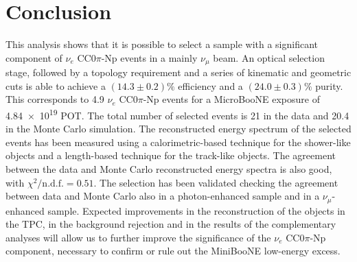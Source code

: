 
\section{Conclusion}
This analysis shows that it is possible to select a sample with a significant component of $\nu_{e}$ CC0$\pi$-Np events in a mainly $\nu_\mu$ beam. An optical selection stage, followed by a topology requirement and a series of kinematic and geometric cuts is able to achieve a $(14.3\pm0.2)\%$ efficiency and a $(24.0\pm0.3)\%$ purity. This corresponds to 4.9 $\nu_{e}$ CC0$\pi$-Np events for a MicroBooNE exposure of \num{4.84e19} POT. The total number of selected events is 21 in the data and 20.4 in the Monte Carlo simulation. 
The reconstructed energy spectrum of the selected events has been measured using a calorimetric-based technique for the shower-like objects and a length-based technique for the track-like objects. The agreement between the data and Monte Carlo reconstructed energy spectra is also good, with $\chi^{2} / \mathrm{n.d.f.} = 0.51$.
The selection has been validated checking the agreement between data and Monte Carlo also in a photon-enhanced sample and in a $\nu_\mu$-enhanced sample.
Expected improvements in the reconstruction of the objects in the TPC, in the background rejection and in the results of the complementary analyses will allow us to further improve the significance of the $\nu_{e}$ CC0$\pi$-Np component, necessary to confirm or rule out the MiniBooNE low-energy excess.